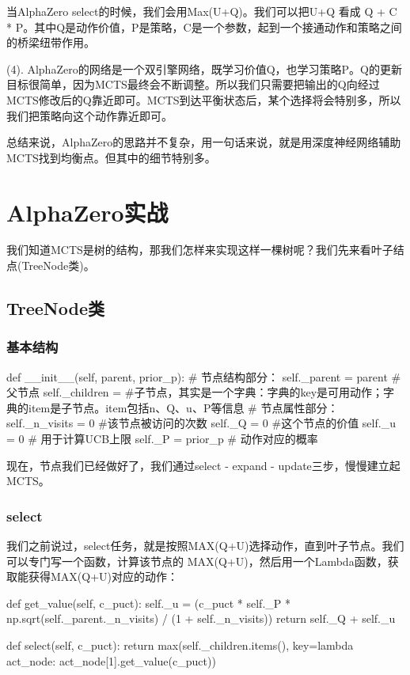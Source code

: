 \documentclass[12pt]{article}
\begin{document}
当AlphaZero select的时候，我们会用Max(U+Q)。我们可以把U+Q 看成 Q + C * P。其中Q是动作价值，P是策略，C是一个参数，起到一个接通动作和策略之间的桥梁纽带作用。

(4). AlphaZero的网络是一个双引擎网络，既学习价值Q，也学习策略P。Q的更新目标很简单，因为MCTS最终会不断调整。所以我们只需要把输出的Q向经过MCTS修改后的Q靠近即可。MCTS到达平衡状态后，某个选择将会特别多，所以我们把策略向这个动作靠近即可。

总结来说，AlphaZero的思路并不复杂，用一句话来说，就是用深度神经网络辅助MCTS找到均衡点。但其中的细节特别多。

\section{AlphaZero实战}
我们知道MCTS是树的结构，那我们怎样来实现这样一棵树呢？我们先来看叶子结点(TreeNode类)。

\subsection{TreeNode类}
\subsubsection{基本结构}
\begin{python}
def __init__(self, parent, prior_p):
    # 节点结构部分：
    self._parent = parent 	#父节点
    self._children = {}		#子节点，其实是一个字典：字典的key是可用动作；字典的item是子节点。item包括n、Q、u、P等信息
    # 节点属性部分：
    self._n_visits = 0		#该节点被访问的次数   
    self._Q = 0			#这个节点的价值      
    self._u = 0			# 用于计算UCB上限
    self._P = prior_p		# 动作对应的概率
\end{python}

现在，节点我们已经做好了，我们通过select - expand - update三步，慢慢建立起MCTS。

\subsubsection{select}
我们之前说过，select任务，就是按照MAX(Q+U)选择动作，直到叶子节点。我们可以专门写一个函数，计算该节点的 MAX(Q+U)，然后用一个Lambda函数，获取能获得MAX(Q+U)对应的动作：
\begin{python}
def get_value(self, c_puct):
    self._u = (c_puct * self._P *
                np.sqrt(self._parent._n_visits) / (1 + self._n_visits))
    return self._Q + self._u
    
def select(self, c_puct):
    return max(self._children.items(), key=lambda act_node: act_node[1].get_value(c_puct))
\end{python}
\end{document}
